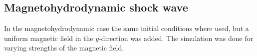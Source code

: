 \subsection{Magnetohydrodynamic shock wave}
In the magnetohydrodynamic case the same initial conditions where used, but a uniform magnetic field in the $y$-direction was added. The simulation was done for varying strengths of the magnetic field.



